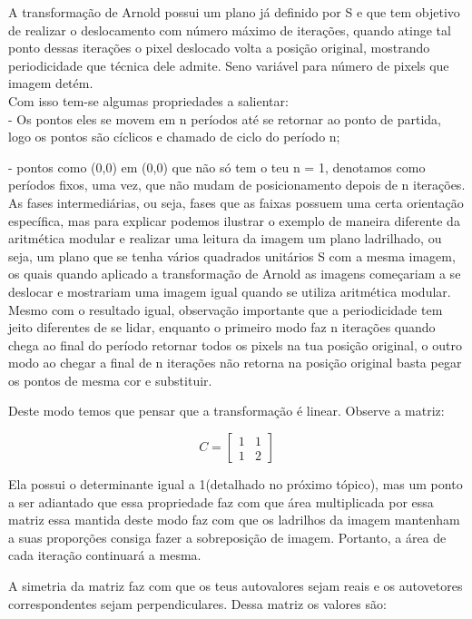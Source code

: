 \documentclass[a4paper, 12pt]{article}
\begin{document}
A transformação de Arnold possui um plano já definido por S e que tem objetivo de realizar o deslocamento com número máximo de iterações, quando atinge tal ponto dessas iterações o pixel deslocado volta a posição original, mostrando periodicidade que técnica dele admite. Seno variável para número de pixels que imagem detém.\\


Com isso tem-se algumas propriedades a salientar:\\

 - Os pontos eles se movem em n períodos até se retornar ao ponto de partida, logo os pontos são cíclicos e chamado de ciclo do período n;
 
 - pontos como  (0,0) em (0,0) que não só tem o teu n = 1, denotamos como períodos fixos, uma vez, que não mudam de posicionamento depois de n iterações.\\

As fases intermediárias, ou seja, fases que as faixas possuem uma certa orientação específica, mas para explicar podemos ilustrar o exemplo de maneira diferente da aritmética modular e realizar uma leitura da imagem um plano ladrilhado, ou seja, um plano que se tenha vários quadrados unitários S  com a mesma imagem, os quais quando aplicado a transformação de Arnold as imagens começariam a se deslocar e mostrariam uma imagem igual quando se utiliza aritmética modular. Mesmo com o resultado igual, observação importante que a periodicidade tem jeito diferentes de se lidar, enquanto o primeiro modo faz n iterações quando chega ao final do período retornar todos os pixels na tua posição original, o outro modo ao chegar a final de n iterações não retorna na posição original basta pegar os pontos de mesma cor e substituir.

Deste modo temos que pensar que a transformação é linear. Observe a matriz:

$$ C = \begin{bmatrix}
1&1\\
1&2
\end{bmatrix}$$

Ela possui o determinante igual a 1(detalhado no próximo tópico), mas um ponto a ser adiantado que essa propriedade faz com que área multiplicada por essa matriz essa mantida deste modo faz com que os ladrilhos da imagem mantenham a suas proporções consiga fazer a sobreposição de imagem. Portanto, a área de cada iteração continuará a mesma.

A simetria da matriz faz com que os teus autovalores sejam reais e os autovetores correspondentes sejam perpendiculares. Dessa matriz os valores são:
\end{document}
